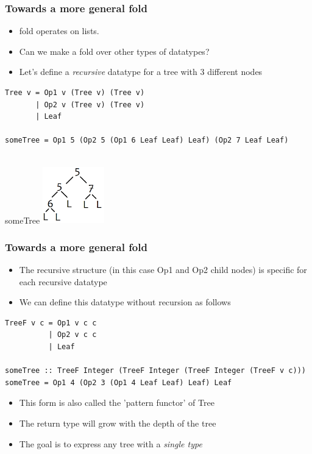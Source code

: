 \documentclass[10pt]{beamer}
\begin{document}
\begin{frame}[fragile]
\frametitle{Towards a more general fold}
\begin{itemize}
\item fold operates on lists.  
\item Can we make a fold over other types of datatypes?
\item Let's define a \textit{recursive} datatype for a tree with 3 different nodes
\end{itemize}

\begin{lstlisting}
Tree v = Op1 v (Tree v) (Tree v) 
       | Op2 v (Tree v) (Tree v) 
       | Leaf

someTree = Op1 5 (Op2 5 (Op1 6 Leaf Leaf) Leaf) (Op2 7 Leaf Leaf)
       
\end{lstlisting}

\begin{block}{someTree}
\includegraphics[width=0.2\textwidth]{tree.png}	
\end{block}

\end{frame}




\begin{frame}[fragile]
\frametitle{Towards a more general fold}
\begin{itemize}
\item The recursive structure (in this case Op1 and Op2 child nodes) is specific for each recursive datatype
\item We can define this datatype without recursion as follows
\end{itemize}

\begin{lstlisting}
TreeF v c = Op1 v c c
          | Op2 v c c 
          | Leaf 

someTree :: TreeF Integer (TreeF Integer (TreeF Integer (TreeF v c)))	  
someTree = Op1 4 (Op2 3 (Op1 4 Leaf Leaf) Leaf) Leaf	  
\end{lstlisting}


\begin{itemize}
\item This form is also called the 'pattern functor' of Tree		
\item The return type will grow with the depth of the tree 
\item The goal is to express any tree with a \textit{single type}	
\end{itemize}

\end{frame}
\end{document}
